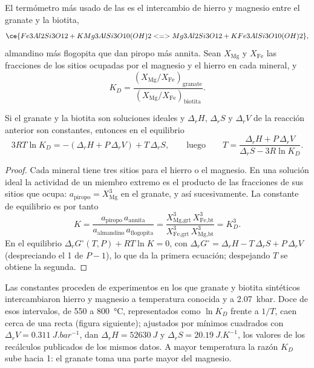 El termómetro más usado de las  es el intercambio de hierro y magnesio
entre el granate y la biotita,
\[
\ce{Fe3Al2Si3O12 + KMg3AlSi3O10(OH)2 <=> Mg3Al2Si3O12 + KFe3AlSi3O10(OH)2},
\]
almandino más flogopita que dan piropo más annita. Sean $X_{\text{Mg}}$ y $X_{\text{Fe}}$
las fracciones de los sitios ocupadas por el magnesio y el hierro en cada mineral, y
\[
K_D = \frac{(X_{\text{Mg}}/X_{\text{Fe}})_{\text{granate}}}{(X_{\text{Mg}}/X_{\text{Fe}})_{\text{biotita}}}.
\]

\begin{proposition}\label{prop:b2:pt-paths:exchange}
Si el granate y la biotita son soluciones ideales y $\Delta_r H$, $\Delta_r S$ y $\Delta_r V$ de
la reacción anterior son constantes, entonces en el equilibrio
\[
3RT\ln K_D = -(\Delta_r H + P\,\Delta_r V) + T\,\Delta_r S,
\qquad\text{luego}\qquad
T = \frac{\Delta_r H + P\,\Delta_r V}{\Delta_r S - 3R\ln K_D}.
\]
\end{proposition}

\begin{proof}
Cada mineral tiene tres sitios para el hierro o el magnesio. En una solución ideal la actividad de
un miembro extremo es el producto de las fracciones de sus sitios que ocupa: $a_{\text{piropo}} =
X_{\text{Mg}}^3$ en el granate, y así sucesivamente. La constante de equilibrio es por tanto
\[
K = \frac{a_{\text{piropo}}\,a_{\text{annita}}}{a_{\text{almandino}}\,a_{\text{flogopita}}}
= \frac{X_{\text{Mg,grt}}^3\,X_{\text{Fe,bt}}^3}{X_{\text{Fe,grt}}^3\,X_{\text{Mg,bt}}^3} = K_D^3 .
\]
En el equilibrio $\Delta_r G^\circ(T, P) + RT\ln K = 0$, con $\Delta_r G^\circ = \Delta_r H -
T\,\Delta_r S + P\,\Delta_r V$ (despreciando el 1 de $P - 1$), lo que da la primera ecuación;
despejando $T$ se obtiene la segunda.
\end{proof}

Las constantes proceden de experimentos en los que granate y biotita sintéticos intercambiaron hierro
y magnesio a temperatura conocida y a \qty{2.07}{kbar}. Doce de esos intervalos, de 550 a
\qty{800}{\celsius}, representados como $\ln K_D$ frente a $1/T$, caen cerca de una recta (figura
siguiente); ajustados por mínimos cuadrados con $\Delta_r V = \qty{0.311}{J.bar^{-1}}$, dan
$\Delta_r H = \qty{52630}{J}$ y $\Delta_r S = \qty{20.19}{J.K^{-1}}$, los valores de los
recálculos publicados de los mismos datos. A mayor temperatura la razón $K_D$ sube
hacia 1: el granate toma una parte mayor del magnesio.

